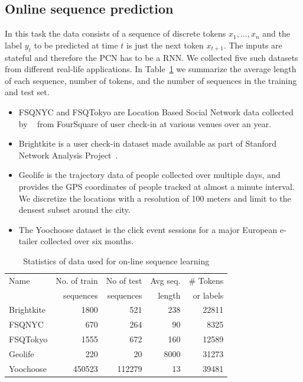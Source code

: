 \documentclass[letterpaper]{article} %
\begin{document}
\subsection{Online sequence prediction}
\label{sec-expt-online}
In this task the data consists of a sequence of discrete tokens $x_1,\ldots,x_n$ and the label $y_t$ to be predicted at time $t$  is just the next token $x_{t+1}$.  The inputs are stateful and therefore the PCN has to be a RNN.
We collected five such datasets from different real-life applications. In Table~\ref{sequence-data} we summarize the average length of each sequence, number of tokens, and the number of sequences in the training and test set.
\begin{itemize}
\item
FSQNYC and FSQTokyo are Location Based Social Network data collected by ~\cite{yang2014} from FourSquare of user check-in at various venues over an year.

\item Brightkite \cite{ChoMyLes11} is a user check-in dataset made available as part of Stanford Network Analysis Project~\cite{snapnets}.

\item
Geolife \cite{geolife09} is the trajectory data of people collected over multiple days, and provides the GPS coordinates of people tracked at almost a minute interval. We discretize the locations with a resolution of 100 meters and limit to the densest subset around the city.
\item
The Yoochoose dataset \cite{Ben-Shimon:2015:RCY:2792838.2798723} is the click event sessions for a major European e-tailer collected over six months.

\end{itemize}

\begin{table}
\begin{center}
\begin{tabular}{|l|r|r|r|r|} \hline
Name & No. of train & No of test & Avg seq. & \# Tokens \\
&  sequences & sequences & length &  or labels  \\ \hline
Brightkite & 1800  & 521  & 238  &  22811 \\
FSQNYC & 670  &  264  & 90  &  8325 \\
FSQTokyo & 1555  & 672  & 160  &  12589 \\
Geolife & 220  & 20  & 8000 &   31273\\
Yoochoose &  450523 & 112279  & 13 &   39481\\ \hline
\end{tabular}
\end{center}
\caption{\label{sequence-data} Statistics of data used for on-line sequence learning}
\end{table}
\end{document}
